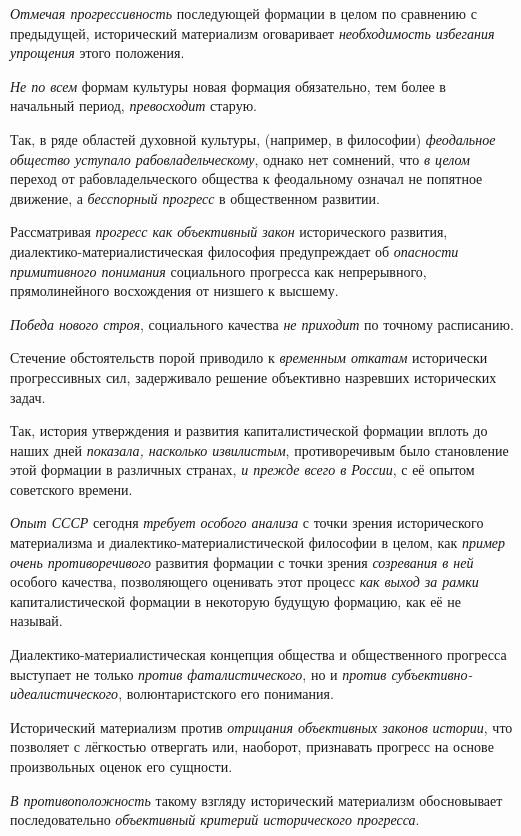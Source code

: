 \documentclass[a4paper,14pt,russian]{extreport}
\begin{document}
\emph{Отмечая прогрессивность} последующей формации в целом по сравнению с предыдущей, исторический материализм оговаривает \emph{необходимость избегания упрощения} этого положения.

\emph{Не по всем} формам культуры новая формация обязательно, тем более в начальный период, \emph{превосходит} старую.

Так, в ряде областей духовной культуры, (например, в философии) \emph{феодальное общество уступало рабовладельческому}, однако нет сомнений, что \emph{в целом} переход от рабовладельческого общества к феодальному означал не попятное движение, а \emph{бесспорный прогресс} в общественном развитии.

Рассматривая \emph{прогресс как объективный закон} исторического развития, диалектико-материалистическая философия предупреждает об \emph{опасности примитивного понимания} социального прогресса как непрерывного, прямолинейного восхождения от низшего к высшему.

\emph{Победа нового строя}, социального качества \emph{не приходит} по точному расписанию.

Стечение обстоятельств порой приводило к \emph{временным откатам} исторически прогрессивных сил, задерживало решение объективно назревших исторических задач.

Так, история утверждения и развития капиталистической формации вплоть до наших дней \emph{показала, насколько извилистым}, противоречивым было становление этой формации в различных странах, \emph{и прежде всего в России}, с её опытом советского времени.

\emph{Опыт СССР} сегодня \emph{требует особого анализа} с точки зрения исторического материализма и диалектико-материалистической философии в целом, как \emph{пример очень противоречивого} развития формации с точки зрения \emph{созревания в ней} особого качества, позволяющего оценивать этот процесс \emph{как выход за рамки} капиталистической формации в некоторую будущую формацию, как её не называй.

Диалектико-материалистическая концепция общества и общественного прогресса выступает не только \emph{против фаталистического}, но и \emph{против субъективно-идеалистического}, волюнтаристского его понимания.

Исторический материализм против \emph{отрицания объективных законов} \emph{истории}, что позволяет с лёгкостью отвергать или, наоборот, признавать прогресс на основе произвольных оценок его сущности.

\emph{В противоположность} такому взгляду исторический материализм обосновывает последовательно \emph{объективный критерий исторического прогресса}.
\end{document}
